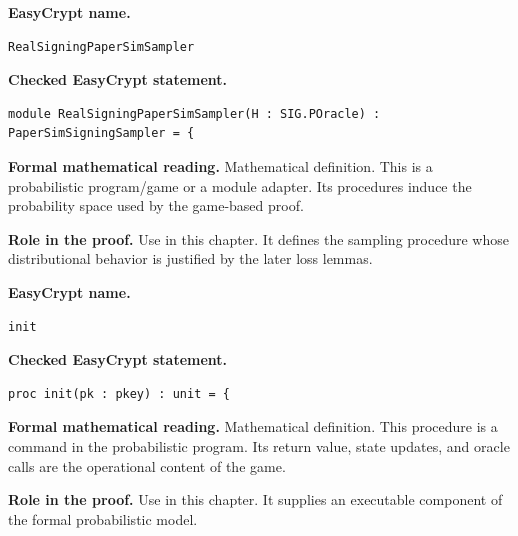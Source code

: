 \begin{formaldefinition}
\noindent\textbf{EasyCrypt name.}
\begin{lstlisting}[language=EasyCrypt,basicstyle=\ttfamily\scriptsize]
RealSigningPaperSimSampler
\end{lstlisting}
\noindent\textbf{Checked EasyCrypt statement.}
\begin{lstlisting}[language=EasyCrypt,basicstyle=\ttfamily\scriptsize]
module RealSigningPaperSimSampler(H : SIG.POracle) : PaperSimSigningSampler = {
\end{lstlisting}
\noindent\textbf{Formal mathematical reading.}
Mathematical definition. This is a probabilistic program/game or a module adapter.  Its procedures induce the probability space used by the game-based proof.

\noindent\textbf{Role in the proof.}
Use in this chapter. It defines the sampling procedure whose distributional behavior is justified by the later loss lemmas.

\end{formaldefinition}

\begin{formaldefinition}
\noindent\textbf{EasyCrypt name.}
\begin{lstlisting}[language=EasyCrypt,basicstyle=\ttfamily\scriptsize]
init
\end{lstlisting}
\noindent\textbf{Checked EasyCrypt statement.}
\begin{lstlisting}[language=EasyCrypt,basicstyle=\ttfamily\scriptsize]
proc init(pk : pkey) : unit = {
\end{lstlisting}
\noindent\textbf{Formal mathematical reading.}
Mathematical definition. This procedure is a command in the probabilistic program.  Its return value, state updates, and oracle calls are the operational content of the game.

\noindent\textbf{Role in the proof.}
Use in this chapter. It supplies an executable component of the formal probabilistic model.

\end{formaldefinition}

